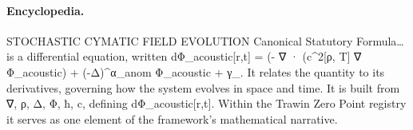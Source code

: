 \paragraph{Encyclopedia.}
STOCHASTIC CYMATIC FIELD EVOLUTION Canonical Statutory Formula… is a differential equation, written dΦ\_acoustic[r,t] = (- ∇ · (c\textasciicircum{}2[ρ, T] ∇ Φ\_acoustic) + (-Δ)\textasciicircum{}α\_anom Φ\_acoustic + γ\_. It relates the quantity to its derivatives, governing how the system evolves in space and time. It is built from ∇, ρ, Δ, Φ, ħ, c, defining dΦ\_acoustic[r,t]. Within the Trawin Zero Point registry it serves as one element of the framework's mathematical narrative.
